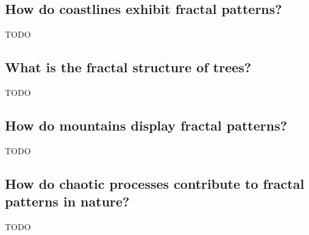 \documentclass[12pt]{article}
\begin{document}
\subsection{How do coastlines exhibit fractal patterns?}
TODO

\subsection{What is the fractal structure of trees?}
TODO

\subsection{How do mountains display fractal patterns?}
TODO

\subsection{How do chaotic processes contribute to fractal patterns in nature?}
TODO
\end{document}
